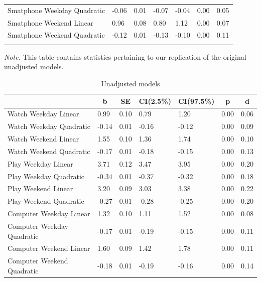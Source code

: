 \documentclass[floatsintext,man]{apa6}
\theoremstyle{definition}
\theoremstyle{definition}
\theoremstyle{definition}
\theoremstyle{remark}
\begin{document}
\begin{table}[tbp]
\begin{center}
\begin{threeparttable}
\begin{tabular}{lllllll}
Smatphone Weekday Quadratic & -0.06 & 0.01 & -0.07 & -0.04 & 0.00 & 0.05\\
Smatphone Weekend Linear & 0.96 & 0.08 & 0.80 & 1.12 & 0.00 & 0.07\\
Smatphone Weekend Quadratic & -0.12 & 0.01 & -0.13 & -0.10 & 0.00 & 0.11\\
\bottomrule
\addlinespace
\end{tabular}
\begin{tablenotes}[para]
\textit{Note.} This table contains statistics pertaining to our replication of the original unadjusted models.
\end{tablenotes}
\end{threeparttable}
\end{center}
\end{table}

\begin{table}[tbp]
\begin{center}
\begin{threeparttable}
\caption{\label{tab:unnamed-chunk-1}Unadjusted models}
\small{
\begin{tabular}{lllllll}
\toprule
 & \multicolumn{1}{c}{b} & \multicolumn{1}{c}{SE} & \multicolumn{1}{c}{CI(2.5\%)} & \multicolumn{1}{c}{CI(97.5\%)} & \multicolumn{1}{c}{p} & \multicolumn{1}{c}{d}\\
\midrule
Watch Weekday Linear & 0.99 & 0.10 & 0.79 & 1.20 & 0.00 & 0.06\\
Watch Weekday Quadratic & -0.14 & 0.01 & -0.16 & -0.12 & 0.00 & 0.09\\
Watch Weekend Linear & 1.55 & 0.10 & 1.36 & 1.74 & 0.00 & 0.10\\
Watch Weekend Quadratic & -0.17 & 0.01 & -0.18 & -0.15 & 0.00 & 0.13\\
Play Weekday Linear & 3.71 & 0.12 & 3.47 & 3.95 & 0.00 & 0.20\\
Play Weekday Quadratic & -0.34 & 0.01 & -0.37 & -0.32 & 0.00 & 0.18\\
Play Weekend Linear & 3.20 & 0.09 & 3.03 & 3.38 & 0.00 & 0.22\\
Play Weekend Quadratic & -0.27 & 0.01 & -0.28 & -0.25 & 0.00 & 0.20\\
Computer Weekday Linear & 1.32 & 0.10 & 1.11 & 1.52 & 0.00 & 0.08\\
Computer Weekday Quadratic & -0.17 & 0.01 & -0.19 & -0.15 & 0.00 & 0.11\\
Computer Weekend Linear & 1.60 & 0.09 & 1.42 & 1.78 & 0.00 & 0.11\\
Computer Weekend Quadratic & -0.18 & 0.01 & -0.19 & -0.16 & 0.00 & 0.14\\

\end{tabular}}
\end{threeparttable}
\end{center}
\end{table}
\end{document}
